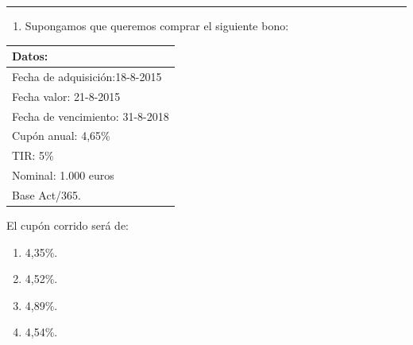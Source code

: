 \documentclass[
  letterpaper,
  DIV=11,
  numbers=noendperiod]{scrreprt}
\providecommand{\tightlist}{%
  \setlength{\itemsep}{0pt}\setlength{\parskip}{0pt}}\usepackage{longtable,booktabs,array}
\begin{document}
\begin{center}\rule{0.5\linewidth}{0.5pt}\end{center}

\begin{enumerate}
\def\labelenumi{\arabic{enumi}.}
\setcounter{enumi}{30}
\tightlist
\item
  Supongamos que queremos comprar el siguiente bono:
\end{enumerate}

\begin{longtable}[]{@{}l@{}}
\toprule()
\textbf{Datos:} \\
\midrule()
\endhead
Fecha de adquisición:18-8-2015 \\
Fecha valor: 21-8-2015 \\
Fecha de vencimiento: 31-8-2018 \\
Cupón anual: 4,65\% \\
TIR: 5\% \\
Nominal: 1.000 euros \\
Base Act/365. \\
\bottomrule()
\end{longtable}

El cupón corrido será de:

\begin{enumerate}
\def\labelenumi{\alph{enumi}.}
\item
  4,35\%.
\item
  4,52\%.
\item
  4,89\%.
\item
  4,54\%.
\end{enumerate}
\end{document}
